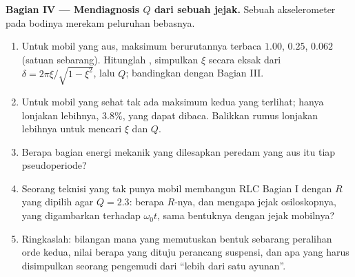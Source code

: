 \begin{problem}
\medskip
\noindent\textbf{Bagian IV --- Mendiagnosis $Q$ dari sebuah jejak.}
Sebuah akselerometer pada bodinya merekam peluruhan bebasnya.
\begin{enumerate}[resume]
  \item Untuk mobil yang aus, maksimum berurutannya terbaca $1.00$, $0.25$, $0.062$
        (satuan sebarang). Hitunglah , simpulkan
        $\xi$ secara eksak dari $\delta = 2\pi\xi/\sqrt{1 - \xi^2}$, lalu $Q$;
        bandingkan dengan Bagian III.
  \item Untuk mobil yang sehat tak ada maksimum kedua yang terlihat;
        hanya lonjakan lebihnya, $3.8\%$, yang dapat dibaca. Balikkan
        rumus lonjakan lebihnya untuk mencari $\xi$ dan $Q$.
  \item Berapa bagian energi mekanik yang dilesapkan peredam yang aus
        itu tiap pseudoperiode?
  \item Seorang teknisi yang tak punya mobil membangun RLC Bagian I
        dengan $R$ yang dipilih agar $Q = 2.3$: berapa $R$-nya, dan
        mengapa jejak osiloskopnya, yang digambarkan terhadap
        $\omega_0 t$, sama bentuknya dengan jejak mobilnya?
  \item Ringkaslah: bilangan  mana yang memutuskan bentuk
        sebarang peralihan orde kedua, nilai berapa yang dituju perancang
        suspensi, dan apa yang harus disimpulkan seorang pengemudi dari
        ``lebih dari satu ayunan''.
\end{enumerate}
\end{problem}
